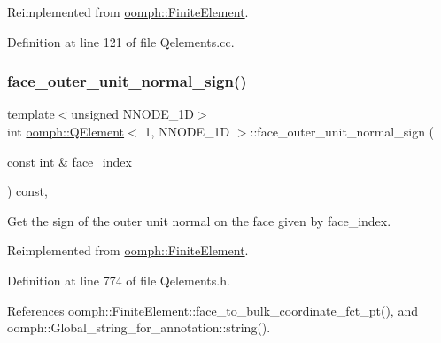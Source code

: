 Reimplemented from \hyperlink{classoomph_1_1FiniteElement_a9db1456b827131c21a991ac9fedf4b0c}{oomph\+::\+Finite\+Element}.



Definition at line 121 of file Qelements.\+cc.

\mbox{\label{classoomph_1_1QElement_3_011_00_01NNODE__1D_01_4_ae4e942432e60479d8c6acbc5a25e7c36}} 
\subsubsection{\texorpdfstring{face\+\_\+outer\+\_\+unit\+\_\+normal\+\_\+sign()}{face\_outer\_unit\_normal\_sign()}}
{\footnotesize\ttfamily template$<$unsigned N\+N\+O\+D\+E\+\_\+1D$>$ \\
int \hyperlink{classoomph_1_1QElement}{oomph\+::\+Q\+Element}$<$ 1, N\+N\+O\+D\+E\+\_\+1D $>$\+::face\+\_\+outer\+\_\+unit\+\_\+normal\+\_\+sign (\begin{DoxyParamCaption}\item[{const int \&}]{face\+\_\+index }\end{DoxyParamCaption}) const\hspace{0.3cm}{\ttfamily [inline]}, {\ttfamily [virtual]}}



Get the sign of the outer unit normal on the face given by face\+\_\+index. 



Reimplemented from \hyperlink{classoomph_1_1FiniteElement_a09ec977bcf493ec78b6979a38d83bb2c}{oomph\+::\+Finite\+Element}.



Definition at line 774 of file Qelements.\+h.



References oomph\+::\+Finite\+Element\+::face\+\_\+to\+\_\+bulk\+\_\+coordinate\+\_\+fct\+\_\+pt(), and oomph\+::\+Global\+\_\+string\+\_\+for\+\_\+annotation\+::string().

\mbox{\label{classoomph_1_1QElement_3_011_00_01NNODE__1D_01_4_a9bb6add7472a726643f28ab984f5b961}} 
